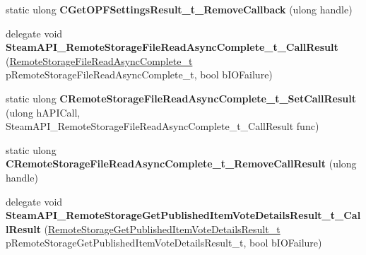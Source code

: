 \begin{DoxyCompactItemize}
\item 
\mbox{\label{class_valve_1_1_interop_1_1_native_entrypoints_a6da6a098a14ca63d9993806b121f2c78}} 
static ulong {\bfseries C\+Get\+O\+P\+F\+Settings\+Result\+\_\+t\+\_\+\+Remove\+Callback} (ulong handle)
\item 
\mbox{\label{class_valve_1_1_interop_1_1_native_entrypoints_a0e2eba2c113882d2179ad7825ba50358}} 
delegate void {\bfseries Steam\+A\+P\+I\+\_\+\+Remote\+Storage\+File\+Read\+Async\+Complete\+\_\+t\+\_\+\+Call\+Result} (\hyperlink{struct_valve_1_1_steamworks_1_1_remote_storage_file_read_async_complete__t}{Remote\+Storage\+File\+Read\+Async\+Complete\+\_\+t} p\+Remote\+Storage\+File\+Read\+Async\+Complete\+\_\+t, bool b\+I\+O\+Failure)
\item 
\mbox{\label{class_valve_1_1_interop_1_1_native_entrypoints_a1bb3ce43376d9468f784da34ff311052}} 
static ulong {\bfseries C\+Remote\+Storage\+File\+Read\+Async\+Complete\+\_\+t\+\_\+\+Set\+Call\+Result} (ulong h\+A\+P\+I\+Call, Steam\+A\+P\+I\+\_\+\+Remote\+Storage\+File\+Read\+Async\+Complete\+\_\+t\+\_\+\+Call\+Result func)
\item 
\mbox{\label{class_valve_1_1_interop_1_1_native_entrypoints_a885b4d08c97025a6ad117b722732f5d9}} 
static ulong {\bfseries C\+Remote\+Storage\+File\+Read\+Async\+Complete\+\_\+t\+\_\+\+Remove\+Call\+Result} (ulong handle)
\item 
\mbox{\label{class_valve_1_1_interop_1_1_native_entrypoints_a0a7f5f470f3fc8f2543b9c45ae4a3321}} 
delegate void {\bfseries Steam\+A\+P\+I\+\_\+\+Remote\+Storage\+Get\+Published\+Item\+Vote\+Details\+Result\+\_\+t\+\_\+\+Call\+Result} (\hyperlink{struct_valve_1_1_steamworks_1_1_remote_storage_get_published_item_vote_details_result__t}{Remote\+Storage\+Get\+Published\+Item\+Vote\+Details\+Result\+\_\+t} p\+Remote\+Storage\+Get\+Published\+Item\+Vote\+Details\+Result\+\_\+t, bool b\+I\+O\+Failure)
\item 
\mbox{\label{class_valve_1_1_interop_1_1_native_entrypoints_aa14fd9222751e76ebc478b7ff140b890}} 

\end{DoxyCompactItemize}
